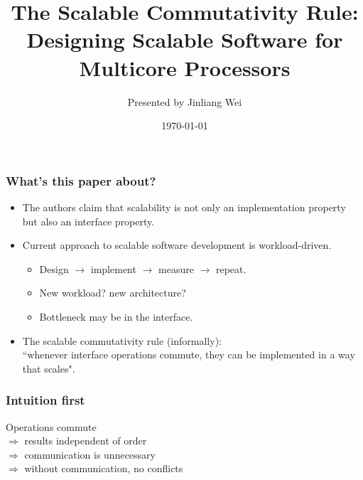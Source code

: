 \documentclass{beamer}
\begin{document}
\title{The Scalable Commutativity Rule: \\
Designing Scalable Software for Multicore Processors} 
\author{Presented by Jinliang Wei} 
\date{\today} 

\frame{\titlepage} 


\begin{frame}
\frametitle{What's this paper about?}

\begin{itemize}
\item The authors claim that scalability is not only an implementation property 
but also an interface property.
\item Current approach to scalable software development is workload-driven.
\begin{itemize}
\item Design $\rightarrow$ implement $\rightarrow$ measure $\rightarrow$ repeat.
\item New workload? new architecture?
\item Bottleneck may be in the interface.
\end{itemize}
\item The scalable commutativity rule (informally): \\
``whenever interface operations commute, they can be implemented in a way that scales".
\end{itemize}

\end{frame}

\begin{frame}
  \frametitle{Intuition first}
Operations commute \\
 $\Rightarrow$ results independent of order \\
 $\Rightarrow$ communication is unnecessary \\
 $\Rightarrow$ without communication, no conflicts \\
\end{frame}
\end{document}
